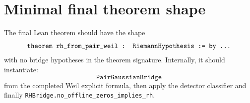 \documentclass[11pt]{article}
\begin{document}
\section{Minimal final theorem shape}

The final Lean theorem should have the shape
\[
\texttt{theorem rh\_from\_pair\_weil : RiemannHypothesis := by \dots}
\]
with no bridge hypotheses in the theorem signature.  Internally, it should instantiate:
\[
  \texttt{PairGaussianBridge}
\]
from the completed Weil explicit formula, then apply the detector classifier and finally
\texttt{RHBridge.no\_offline\_zeros\_implies\_rh}.
\end{document}

